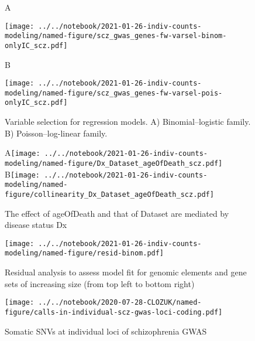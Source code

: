 \documentclass[letterpaper]{article}
\begin{document}
\begin{figure}[p]
\begin{center}
A

\texttt{[image: ../../notebook/2021-01-26-indiv-counts-modeling/named-figure/scz\_gwas\_genes-fw-varsel-binom-onlyIC\_scz.pdf]}

B

\texttt{[image: ../../notebook/2021-01-26-indiv-counts-modeling/named-figure/scz\_gwas\_genes-fw-varsel-pois-onlyIC\_scz.pdf]}
\end{center}
\caption{
Variable selection for regression models. A) Binomial--logistic
family.  B) Poisson--log-linear family.
}
\label{fig:varsel}
\end{figure}

\begin{figure}[p]
\begin{center}
A\texttt{[image: ../../notebook/2021-01-26-indiv-counts-modeling/named-figure/Dx\_Dataset\_ageOfDeath\_scz.pdf]}
B\texttt{[image: ../../notebook/2021-01-26-indiv-counts-modeling/named-figure/collinearity\_Dx\_Dataset\_ageOfDeath\_scz.pdf]}
\end{center}
\caption{
The effect of ageOfDeath and that of Dataset are mediated by disease status Dx
}
\label{fig:d-separation}
\end{figure}

\begin{figure}[p]
\texttt{[image: ../../notebook/2021-01-26-indiv-counts-modeling/named-figure/resid-binom.pdf]}
\caption{
Residual analysis to assess model fit for genomic elements and gene
sets of increasing size (from top left to bottom right)
}
\label{fig:residual-QQ}
\end{figure}

\begin{figure}[p]
\texttt{[image: ../../notebook/2020-07-28-CLOZUK/named-figure/calls-in-individual-scz-gwas-loci-coding.pdf]}
\caption{
Somatic SNVs at individual loci of schizophrenia GWAS
}
\label{fig:indiv-scz-gwas-loci}
\end{figure}
\end{document}
